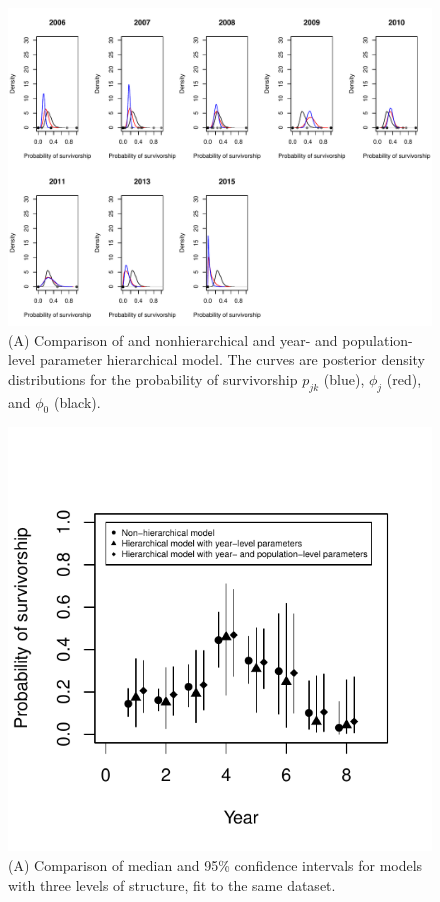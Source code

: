 \documentclass[12pt, oneside, titlepage]{article}   	%
\begin{document}
\begin{figure}[h]
   \centering
       \includegraphics[page=1,width=.9\textwidth]{../figures/appendix-x-hierarchyPosteriors_nh_hyearpop}  
    \caption{ (A) Comparison of and nonhierarchical and year- and population-level parameter hierarchical model.  The curves are posterior density distributions for the probability of survivorship $p_{jk}$ (blue), $\phi_j$ (red), and $\phi_0$ (black).  }
 \label{fig:hierarchyPosteriors_nh_hyearpop}
\end{figure}


 \begin{figure}[h]
   \centering
       \includegraphics[page=1,width=.9\textwidth]{../figures/appendix-x-hierarchyPosteriorsSummary}  
    \caption{ (A) Comparison of median and 95\% confidence intervals for models with three levels of structure, fit to the same dataset.   }
 \label{fig:hierarchyPosteriorsSummary}
\end{figure}
\end{document}
